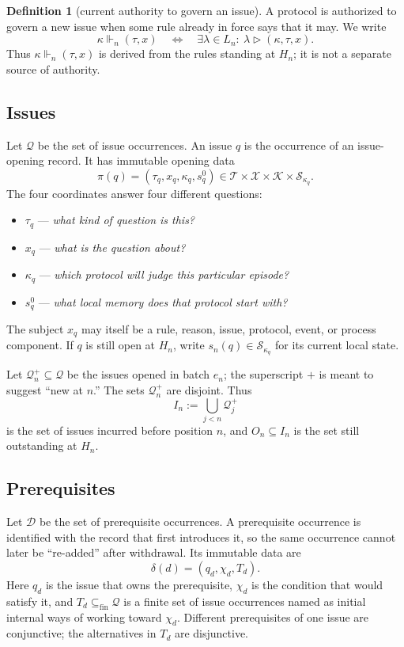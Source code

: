 \documentclass[11pt]{article}
\theoremstyle{definition}
\newtheorem*{definition}{Definition}
\theoremstyle{remark}
\newcommand{\fin}{\subseteq_{\mathrm{fin}}}
\newcommand{\Born}{\mathcal Q^{+}}
\begin{document}
\begin{definition}[current authority to govern an issue]
A protocol is authorized to govern a new issue when some rule already in force
says that it may. We write
\[
 \kappa\Vdash_n(\tau,x)
 \quad\Longleftrightarrow\quad
 \exists\lambda\in L_n:\ \lambda\triangleright(\kappa,\tau,x).
\]
Thus $\kappa\Vdash_n(\tau,x)$ is derived from the rules standing at $H_n$; it
is not a separate source of authority.
\end{definition}

\subsection{Issues}

Let $\mathcal Q$ be the set of issue occurrences. An issue $q$ is the occurrence
of an issue-opening record. It has immutable opening data
\[
 \pi(q)=(\tau_q,x_q,\kappa_q,s_q^0)
 \in \mathcal T\times\mathcal X\times\mathcal K\times\mathcal S_{\kappa_q}.
\]
The four coordinates answer four different questions:
\begin{itemize}[itemsep=1pt,topsep=2pt]
 \item $\tau_q$ --- \emph{what kind of question is this?}
 \item $x_q$ --- \emph{what is the question about?}
 \item $\kappa_q$ --- \emph{which protocol will judge this particular episode?}
 \item $s_q^0$ --- \emph{what local memory does that protocol start with?}
\end{itemize}
The subject $x_q$ may itself be a rule, reason, issue, protocol, event, or
process component. If $q$ is still open at $H_n$, write
$s_n(q)\in\mathcal S_{\kappa_q}$ for its current local state.

Let $\Born_n\subseteq\mathcal Q$ be the issues opened in batch $e_n$; the
superscript $+$ is meant to suggest ``new at $n$.'' The sets $\Born_n$ are
disjoint. Thus
\[
 I_n:=\bigcup_{j<n}\Born_j
\]
is the set of issues incurred before position $n$, and $O_n\subseteq I_n$ is
the set still outstanding at $H_n$.

\subsection{Prerequisites}

Let $\mathcal D$ be the set of prerequisite occurrences. A prerequisite
occurrence is identified with the record that first introduces it, so the same
occurrence cannot later be ``re-added'' after withdrawal. Its immutable data are
\[
 \delta(d)=(q_d,\chi_d,T_d).
\]
Here $q_d$ is the issue that owns the prerequisite, $\chi_d$ is the condition
that would satisfy it, and $T_d\fin\mathcal Q$ is a finite set of issue
occurrences named as initial internal ways of working toward $\chi_d$.
Different prerequisites of one issue are conjunctive; the alternatives in
$T_d$ are disjunctive.
\end{document}
